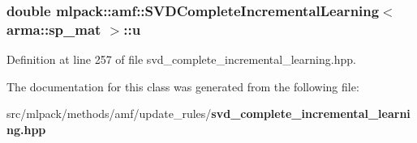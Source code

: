 \subsubsection[{u}]{\setlength{\rightskip}{0pt plus 5cm}double {\bf mlpack\+::amf\+::\+S\+V\+D\+Complete\+Incremental\+Learning}$<$ arma\+::sp\+\_\+mat $>$\+::u\hspace{0.3cm}{\ttfamily [private]}}\label{classmlpack_1_1amf_1_1SVDCompleteIncrementalLearning_3_01arma_1_1sp__mat_01_4_a17f68610d563b1d31a9b912b4cb3aead}


Definition at line 257 of file svd\+\_\+complete\+\_\+incremental\+\_\+learning.\+hpp.



The documentation for this class was generated from the following file\+:\begin{DoxyCompactItemize}
\item 
src/mlpack/methods/amf/update\+\_\+rules/{\bf svd\+\_\+complete\+\_\+incremental\+\_\+learning.\+hpp}\end{DoxyCompactItemize}
